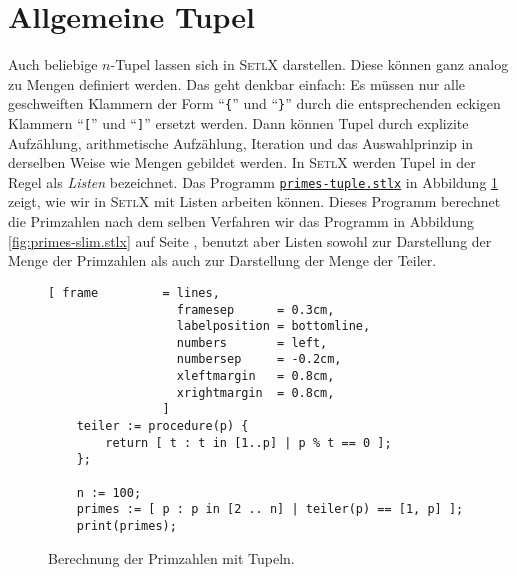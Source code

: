 \section{Allgemeine Tupel}
Auch beliebige $n$-Tupel lassen sich in \textsc{SetlX} darstellen.  Diese können
ganz analog zu Mengen definiert werden.  Das geht denkbar einfach: Es müssen nur
alle geschweiften Klammern der Form ``\texttt{\{}'' und ``\texttt{\}}'' durch
die entsprechenden eckigen Klammern ``\texttt{[}'' und ``\texttt{]}'' ersetzt
werden.  Dann können Tupel durch explizite Aufzählung, arithmetische Aufzählung, Iteration und das
Auswahlprinzip in derselben Weise wie Mengen gebildet werden.  In \textsc{SetlX} werden Tupel in
der Regel als \emph{Listen} bezeichnet.  Das Programm 
\href{https://github.com/karlstroetmann/Logik/blob/master/SetlX/primes-tuple.stlx}{\texttt{primes-tuple.stlx}}
in Abbildung \ref{fig:primes-tuple.stlx} zeigt, wie wir in \textsc{SetlX} mit Listen arbeiten
können.  Dieses Programm berechnet die Primzahlen nach dem selben 
Verfahren wir das Programm in Abbildung \ref{fig:primes-slim.stlx} auf Seite
\pageref{fig:primes-slim.stlx}, benutzt aber Listen sowohl zur Darstellung der Menge der Primzahlen als auch
zur Darstellung der Menge der Teiler.

\begin{figure}[!ht]
  \centering
\begin{Verbatim}[ frame         = lines, 
                  framesep      = 0.3cm, 
                  labelposition = bottomline,
                  numbers       = left,
                  numbersep     = -0.2cm,
                  xleftmargin   = 0.8cm,
                  xrightmargin  = 0.8cm,
                ]
    teiler := procedure(p) {
        return [ t : t in [1..p] | p % t == 0 ];
    };
    
    n := 100;
    primes := [ p : p in [2 .. n] | teiler(p) == [1, p] ];
    print(primes);
\end{Verbatim} 
\vspace*{-0.3cm}
\caption{Berechnung der Primzahlen mit Tupeln.}  
\label{fig:primes-tuple.stlx}
\end{figure} %

